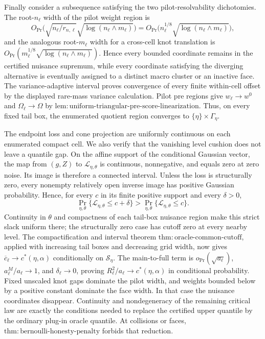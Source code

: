 Finally consider a subsequence satisfying the two pilot-resolvability dichotomies.  The root-\(n_\ell\) width of the pilot weight region is
\[
 O_{\Pr}\bigl(\sqrt{n_\ell/r_{n,\ell}}
                  \sqrt{\log(n_\ell\wedge m_\ell)}\bigr)
 =O_{\Pr}\bigl(n_\ell^{1/8}
                  \sqrt{\log(n_\ell\wedge m_\ell)}\bigr),
\]
and the analogous root-\(m_\ell\) width for a cross-cell knot translation is
\(O_{\Pr}(m_\ell^{1/8}\sqrt{\log(n_\ell\wedge m_\ell)})\).  Hence every bounded coordinate remains in the certified nuisance supremum, while every coordinate satisfying the diverging alternative is eventually assigned to a distinct macro cluster or an inactive face.  The variance-adaptive interval proves convergence of every finite within-cell offset by the displayed rare-mass variance calculation.  Pilot pre regions give \(w_\ell\to w^0\) and \(\Omega_\ell\to\Omega\) by \(\mathrm{lem:uniform\mbox{-}triangular\mbox{-}pre\mbox{-}score\mbox{-}linearization}\).  Thus, on every fixed tail box, the enumerated quotient region converges to \(\{\eta\}\times\Gamma_\eta\).

The endpoint loss and cone projection are uniformly continuous on each enumerated compact cell.  We also verify that the vanishing level cushion does not leave a quantile gap.  On the affine support of the conditional Gaussian vector, the map from \((g,Z)\) to \(\mathcal L_{\eta,\theta}\) is continuous, nonnegative, and equals zero at zero noise.  Its image is therefore a connected interval.  Unless the loss is structurally zero, every nonempty relatively open inverse image has positive Gaussian probability.  Hence, for every \(c\) in its finite positive support and every \(\delta>0\),
\[
 \Pr_{\eta,\theta}\{\mathcal L_{\eta,\theta}\leq c+\delta\}
 >
 \Pr_{\eta,\theta}\{\mathcal L_{\eta,\theta}\leq c\}.
\]
Continuity in \(\theta\) and compactness of each tail-box nuisance region make this strict slack uniform there; the structurally zero case has cutoff zero at every nearby level.  The compactification and interval theorem \(\mathrm{thm:oracle\mbox{-}common\mbox{-}cutoff}\), applied with increasing tail boxes and decreasing grid width, now gives
\(\overline c_\ell\to c^*(\eta,\alpha)\) conditionally on \(\mathscr S_\eta\).  The main-to-full term is \(o_{\Pr}(\sqrt{a_\ell})\), \(a^M_\ell/a_\ell\to1\), and \(\delta_\ell\to0\), proving
\(R_\ell^2/a_\ell\to c^*(\eta,\alpha)\) in conditional probability.  Fixed unscaled knot gaps dominate the pilot width, and weights bounded below by a positive constant dominate the face width.  In that case the nuisance coordinates disappear.  Continuity and nondegeneracy of the remaining critical law are exactly the conditions needed to replace the certified upper quantile by the ordinary plug-in oracle quantile.  At collisions or faces, \(\mathrm{thm:bernoulli\mbox{-}honesty\mbox{-}penalty}\) forbids that reduction.

